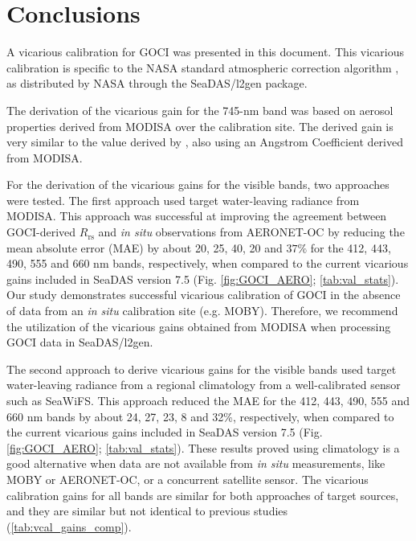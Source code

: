 \documentclass[]{interact}
\theoremstyle{plain}%
\theoremstyle{definition}
\theoremstyle{remark}
\begin{document}
\section{Conclusions}



A vicarious calibration for GOCI was presented in this document. This vicarious calibration is specific to the NASA standard atmospheric correction algorithm \citep{Mobley2016}, as distributed by NASA through the SeaDAS/l2gen package. 

The derivation of the vicarious gain for the 745-nm band was based on aerosol properties derived from MODISA over the calibration site. The derived gain is very similar to the value derived by \cite{Wang:13}, also using an Angstrom Coefficient derived from MODISA. 

For the derivation of the vicarious gains for the visible bands, two approaches were tested. The first approach used target water-leaving radiance from MODISA. This approach was successful at improving the agreement between GOCI-derived $R_\text{rs}$ and {\it in situ} observations from AERONET-OC by reducing the mean absolute error (MAE) by about 20, 25, 40, 20 and $37\%$ for the 412, 443, 490, 555 and 660 nm bands, respectively, when compared to the current vicarious gains included in SeaDAS version 7.5 (Fig. \ref{fig:GOCI_AERO}; \autoref{tab:val_stats}). Our study demonstrates successful vicarious calibration of GOCI in the absence of data from an {\it in situ} calibration site (e.g. MOBY). Therefore, we recommend the utilization of the vicarious gains obtained from MODISA when processing GOCI data in SeaDAS/l2gen.

The second approach to derive vicarious gains for the visible bands used target water-leaving radiance from a regional climatology from a well-calibrated sensor such as SeaWiFS. This approach reduced the MAE for the 412, 443, 490, 555 and 660 nm bands by about 24, 27, 23, 8 and 32\%, respectively, when compared to the current vicarious gains included in SeaDAS version 7.5 (Fig. \ref{fig:GOCI_AERO}; \autoref{tab:val_stats}). These results proved using climatology is a good alternative when data are not available from {\it in situ} measurements, like MOBY or AERONET-OC, or a concurrent satellite sensor. The vicarious calibration gains for all bands are similar for both approaches of target sources, and they are similar but not identical to previous studies \citep{Wang:13,Ahn2015} (\autoref{tab:vcal_gains_comp}).
\end{document}
